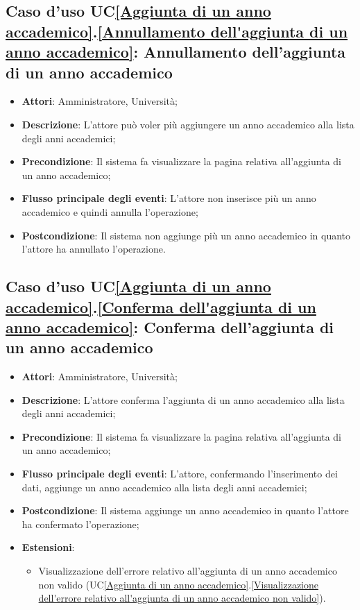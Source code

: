 \subsection{Caso d'uso UC\ref{Aggiunta di un anno accademico}.\ref{Annullamento dell'aggiunta di un anno accademico}: Annullamento dell'aggiunta di un anno accademico}
\begin{itemize}
	\item \textbf{Attori}: Amministratore, Università;
	\item \textbf{Descrizione}: L'attore può voler più aggiungere un anno accademico alla lista degli anni accademici;
	\item \textbf{Precondizione}: Il sistema fa visualizzare la pagina relativa all'aggiunta di un anno accademico;
	\item \textbf{Flusso principale degli eventi}: L'attore non inserisce più un anno accademico e quindi annulla l'operazione;
	\item \textbf{Postcondizione}: Il sistema non aggiunge più un anno accademico in quanto l'attore ha annullato l'operazione.
\end{itemize}

\subsection{Caso d'uso UC\ref{Aggiunta di un anno accademico}.\ref{Conferma dell'aggiunta di un anno accademico}: Conferma dell'aggiunta di un anno accademico}
\begin{itemize}
	\item \textbf{Attori}: Amministratore, Università;
	\item \textbf{Descrizione}: L'attore conferma l'aggiunta di un anno accademico alla lista degli anni accademici;
	\item \textbf{Precondizione}: Il sistema fa visualizzare la pagina relativa all'aggiunta di un anno accademico;
	\item \textbf{Flusso principale degli eventi}: L'attore, confermando l'inserimento dei dati, aggiunge un anno accademico alla lista degli anni accademici;
	\item \textbf{Postcondizione}: Il sistema aggiunge un anno accademico in quanto l'attore ha confermato l'operazione;
	\item \textbf{Estensioni}:
	\begin{itemize}
		\item Visualizzazione dell'errore relativo all'aggiunta di un anno accademico non valido (UC\ref{Aggiunta di un anno accademico}.\ref{Visualizzazione dell'errore relativo all'aggiunta di un anno accademico non valido}).
	\end{itemize}
\end{itemize}


